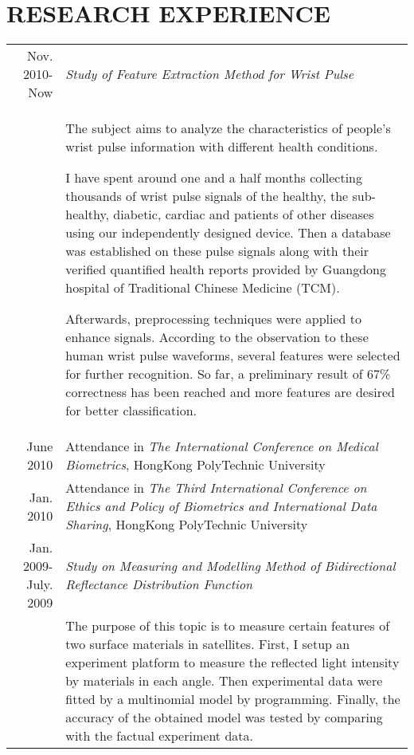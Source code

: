 \documentclass[a4paper,10pt]{article}
\begin{document}
\section{RESEARCH EXPERIENCE}
\begin{tabular}{rp{12cm}}
    \textsf{Nov. 2010-Now} & \textit{Study of Feature Extraction
    Method for Wrist Pulse}\\
    & \setlength{\parindent}{2em} The subject aims to analyze the
    characteristics of people's wrist pulse 
    information with different health conditions. 
    
    I have spent around one and a half months collecting thousands of
    wrist pulse signals of the healthy, the sub-healthy, diabetic, cardiac and
    patients of other diseases using our independently designed device. 
    Then a database was established on these pulse signals along with
    their verified quantified health reports provided by Guangdong
    hospital of Traditional Chinese Medicine (TCM).
    
    Afterwards, preprocessing techniques were applied to enhance signals. According
    to the observation to these human wrist pulse waveforms, several
    features were selected for further recognition. So far, a
    preliminary result of 67\% correctness has been reached and more
    features are desired for better classification. \\[2mm] 
    \textsf{June 2010} & Attendance in \textit{The International
    Conference on Medical Biometrics}, HongKong PolyTechnic
    University \\ [2mm]
    \textsf{Jan. 2010} & Attendance in \textit{The Third International
    Conference on Ethics and Policy of Biometrics and International
    Data Sharing}, HongKong PolyTechnic University \\ [2mm] 
    \textsf{Jan. 2009-July. 2009} & \textit{
    Study on Measuring and Modelling Method of Bidirectional
    Reflectance Distribution Function} \\
    & \setlength{\parindent}{2em} The purpose of this topic is to
    measure certain features of two surface materials in satellites.
    First, I setup an experiment platform to measure the reflected
    light intensity by materials in each angle. Then experimental data
    were fitted by a multinomial model by programming. Finally, the
    accuracy of the obtained model was tested by comparing with the
    factual experiment data. 
\end{tabular}

\end{document}
